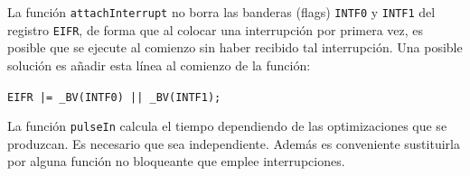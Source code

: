 \documentclass[10pt,a4paper,hidelinks]{article}
\begin{document}
\begin{multicols}{2}
La función \texttt{attachInterrupt} no borra las banderas (flags) \texttt{INTF0} 
y \texttt{INTF1} del registro \texttt{EIFR}, de forma que al colocar una 
interrupción por primera vez, es posible que se ejecute al comienzo sin haber 
recibido tal interrupción. Una posible solución es añadir esta línea al comienzo 
de la función:

\texttt{EIFR |= \_BV(INTF0) || \_BV(INTF1);}

La función \texttt{pulseIn} calcula el tiempo dependiendo de las optimizaciones
que se produzcan. Es necesario que sea independiente. Además es conveniente
sustituirla por alguna función no bloqueante que emplee interrupciones.
\\

\end{multicols}
\end{document}
